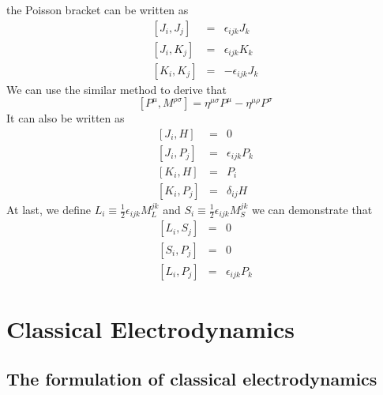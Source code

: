 the Poisson bracket can be written as
\begin{eqnarray}
	\left[J_i,J_j\right] &=& \epsilon_{ijk}J_k \nonumber \\
	\left[J_i,K_j\right] &=& \epsilon_{ijk}K_k \nonumber \\
	\left[K_i,K_j\right] &=& -\epsilon_{ijk}J_k \nonumber
\end{eqnarray}
We can use the similar method to derive that
\[[P^{\mu},M^{\rho \sigma}] = \eta^{\mu \sigma}P^{\mu} - \eta^{\mu \rho}P^{\sigma}\]
It can also be written as
\begin{eqnarray}
	\left[J_i,H\right] &=& 0 \nonumber \\
	\left[J_i,P_j\right] &=& \epsilon_{ijk}P_k \nonumber \\
	\left[K_i,H\right] &=& P_i \nonumber \\
	\left[K_i,P_j\right] &=& \delta_{ij}H \nonumber
\end{eqnarray}
At last, we define $L_i \equiv \frac{1}{2} \epsilon_{ijk} M_L^{jk}$ and $S_i \equiv \frac{1}{2} \epsilon_{ijk} M_S^{jk}$
we can demonstrate that
\begin{eqnarray}
	\left[L_i,S_j\right] &=& 0 \nonumber \\
	\left[S_i,P_j\right] &=& 0 \nonumber \\
	\left[L_i,P_j\right] &=& \epsilon_{ijk}P_k \nonumber
\end{eqnarray}

\chapter{Classical Electrodynamics}
\section{The formulation of classical electrodynamics}
